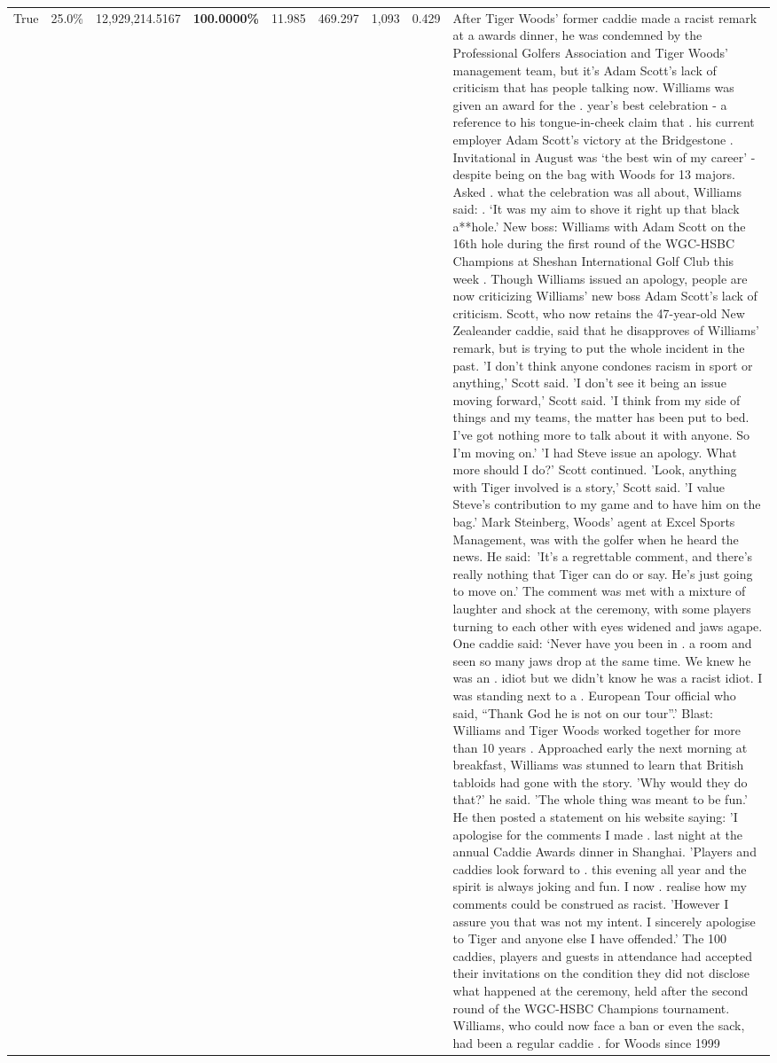 \begin{table}[H]
\begin{tabular}{lllrlllll}
True & 25.0\% & 12,929,214.5167 & \bfseries \color{red} 100.0000\% & 11.985 & 469.297 & 1,093 & 0.429 & After Tiger Woods' former caddie made a racist remark at a awards dinner, he was condemned by the Professional Golfers Association and Tiger Woods' management team, but it's Adam Scott's lack of criticism that has people talking now. Williams was given an award for the . year’s best celebration - a reference to his tongue-in-cheek claim that . his current employer Adam Scott’s victory at the Bridgestone . Invitational in August was ‘the best win of my career’ - despite being on the bag with Woods for 13 majors. Asked . what the celebration was all about, Williams said: . ‘It was my aim to shove it right up that black a**hole.’ New boss: Williams with Adam Scott  on the 16th hole during the first round of the WGC-HSBC Champions at Sheshan International Golf Club this week . Though Williams issued an apology, people are now criticizing Williams' new boss Adam Scott's lack of criticism. Scott, who now retains the 47-year-old New Zealeander caddie, said that he disapproves of Williams' remark, but is trying to put the whole incident in the past. 'I don't think anyone condones racism in sport or anything,' Scott said. 'I don't see it being an issue moving forward,' Scott said. 'I think from my side of things and my teams, the matter has been put to bed. I've got nothing more to talk about it with anyone. So I'm moving on.' 'I had Steve issue an apology. What more should I do?' Scott continued. 'Look, anything with Tiger involved is a story,' Scott said. 'I value Steve's contribution to my game and to have him on the bag.' Mark Steinberg, Woods' agent at Excel Sports Management, was with the golfer when he heard the news. He said: 'It's a regrettable comment, and there's really nothing that Tiger can do or say. He's just going to move on.' The comment was met with a mixture of laughter and shock at the ceremony, with some players turning to each other with eyes widened and jaws agape. One caddie said: ‘Never have you been in . a room and seen so many jaws drop at the same time. We knew he was an . idiot but we didn’t know he was a racist idiot. I was standing next to a . European Tour official who said, “Thank God he is not on our tour”.’ Blast: Williams and Tiger Woods worked together for more than 10 years . Approached early the next morning at breakfast, Williams was stunned to learn that British tabloids had gone with the story. 'Why would they do that?' he said. 'The whole thing was meant to be fun.' He then posted a statement on his website saying: 'I apologise for the comments I made . last night at the annual Caddie Awards dinner in Shanghai. 'Players and caddies look forward to . this evening all year and the spirit is always joking and fun. I now . realise how my comments could be construed as racist. 'However I assure you that was not my intent. I sincerely apologise to Tiger and anyone else I have offended.' The 100 caddies, players and guests in attendance had accepted their invitations on the condition they did not disclose what happened at the ceremony, held after the second round of the WGC-HSBC Champions tournament. Williams, who could now face a ban or even the sack, had been a regular caddie . for Woods since 1999 
\end{tabular}
\end{table}
